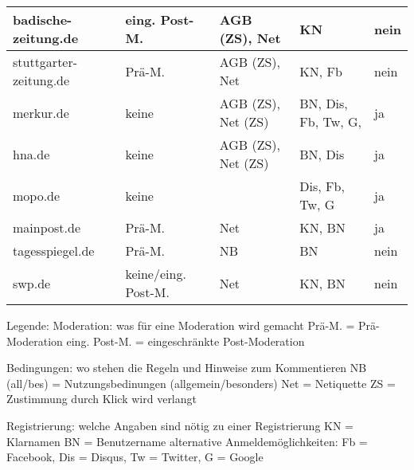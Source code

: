 \begin{landscape}
\begin{longtable}{l|llll}
badische-zeitung.de	& eing. Post-M.		& AGB (ZS), Net			& KN 							& nein \tabularnewline \hline
stuttgarter-zeitung.de	& Prä-M.		& AGB (ZS), Net			& KN, Fb 						& nein \tabularnewline \hline
merkur.de			& keine			& AGB (ZS), Net (ZS)		& BN, Dis, Fb, Tw, G, 				& ja \tabularnewline \hline
hna.de			& keine			& AGB (ZS), Net (ZS)		& BN, Dis 						& ja \tabularnewline \hline
mopo.de			& keine			&				& Dis, Fb, Tw, G 					& ja \tabularnewline \hline
mainpost.de		& Prä-M.		& Net				& KN, BN 						& ja \tabularnewline \hline
tagesspiegel.de		& Prä-M.		& NB				& BN 							& nein \tabularnewline \hline
swp.de			& keine/eing. Post-M.	& Net				& KN, BN 						& nein \tabularnewline \hline


\end{longtable}
\end{landscape}

Legende: 
Moderation: was für eine Moderation wird gemacht
Prä-M. = Prä-Moderation
eing. Post-M. = eingeschränkte Post-Moderation

Bedingungen: wo stehen die Regeln und Hinweise zum Kommentieren
NB (all/bes) = Nutzungsbedinungen (allgemein/besonders)
Net = Netiquette
ZS = Zustimmung durch Klick wird verlangt

Registrierung: welche Angaben sind nötig zu einer Registrierung
KN = Klarnamen
BN = Benutzername
alternative Anmeldemöglichkeiten: Fb = Facebook, Dis = Disqus, Tw = Twitter, G = Google



